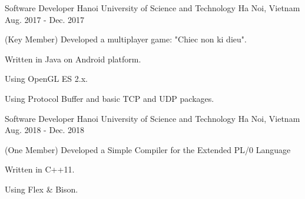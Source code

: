 \begin{cventries}

\cventry
{Software Developer} %
{Hanoi University of Science and Technology} %
{Ha Noi, Vietnam} %
{Aug. 2017 - Dec. 2017} %
{ %
\begin{cvitems}
\item{(Key Member) Developed a multiplayer game: "Chiec non ki dieu".}
\item{Written in Java on Android platform.}
\item{Using OpenGL ES 2.x.}
\item{Using Protocol Buffer and basic TCP and UDP packages.}
\end{cvitems}
}


\cventry
{Software Developer} %
{Hanoi University of Science and Technology} %
{Ha Noi, Vietnam} %
{Aug. 2018 - Dec. 2018} %
{ %
\begin{cvitems}
\item{(One Member) Developed a Simple Compiler for the Extended PL/0 Language}
\item{Written in C++11.}
\item{Using Flex \& Bison.}
\end{cvitems}
}


\end{cventries}
